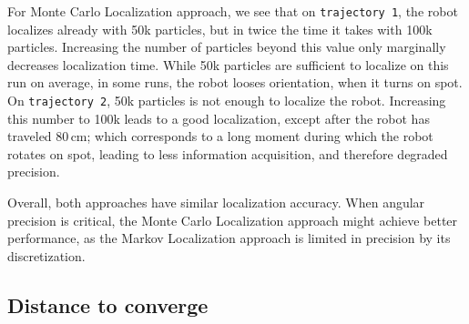 \documentclass[letterpaper, 10pt, conference]{ieeeconf}
\begin{document}
For Monte Carlo Localization approach, we see that on \texttt{trajectory~1}, the robot localizes already with 50k particles, but in twice the time it takes with 100k particles.
Increasing the number of particles beyond this value only marginally decreases localization time.
While 50k particles are sufficient to localize on this run on average, in some runs, the robot looses orientation, when it turns on spot.
On \texttt{trajectory~2}, 50k particles is not enough to localize the robot.
Increasing this number to 100k leads to a good localization, except after the robot has traveled 80\,cm; which corresponds to a long moment during which the robot rotates on spot, leading to less information acquisition, and therefore degraded precision.

Overall, both approaches have similar localization accuracy.
When angular precision is critical, the Monte Carlo Localization approach might achieve better performance, as the Markov Localization approach is limited in precision by its discretization.


\subsection{Distance to converge}
\end{document}
